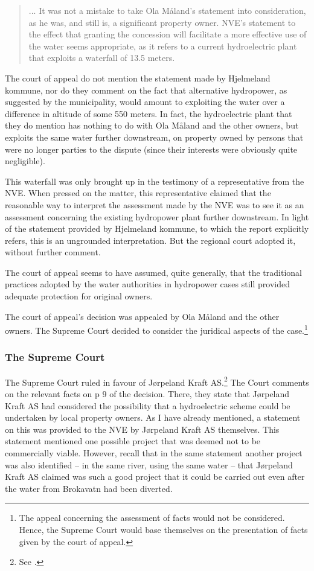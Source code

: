 \begin{quote}... It was not a mistake to take Ola Måland's statement into consideration, as he was, and still is, a significant property owner. NVE's statement to the effect that granting the concession will facilitate a more effective use of the water seems appropriate, as it refers to a current hydroelectric plant that exploits a waterfall of 13.5 meters.
\end{quote}

The court of appeal do not mention the statement made by Hjelmeland kommune, nor do they comment on the fact that alternative hydropower, as suggested by the municipality, would amount to exploiting the water over a difference in altitude of some 550 meters. In fact, the hydroelectric plant that they do mention has nothing to do with Ola Måland and the other owners, but exploits the same water further downstream, on property owned by persons that were no longer parties to the dispute (since their interests were obviously quite negligible).

This waterfall was only brought up in the testimony of a representative from the NVE. When pressed on the matter, this representative claimed that the reasonable way to interpret the assessment made by the NVE was to see it as an assessment concerning the existing hydropower plant further downstream. In light of the statement provided by Hjelmeland kommune, to which the report explicitly refers, this is an ungrounded interpretation. But the regional court adopted it, without further comment.

The court of appeal seems to have assumed, quite generally, that the traditional practices adopted by the water authorities in hydropower cases still provided adequate protection for original owners.

The court of appeal's decision was appealed by Ola Måland and the other owners. The Supreme Court decided to consider the juridical aspects of the case.\footnote{The appeal concerning the assessment of facts would not be considered. Hence, the Supreme Court would base themselves on the presentation of facts given by the court of appeal.}

\subsubsection{The Supreme Court}

The Supreme Court ruled in favour of Jørpeland Kraft AS.\footnote{See \cite{jorpeland11}.} The Court comments on the relevant facts on p 9 of the decision. There, they state that Jørpeland Kraft AS had considered the possibility that a hydroelectric scheme could be undertaken by local property owners. As I have already mentioned, a statement on this was provided to the NVE by Jørpeland Kraft AS themselves. This statement mentioned one possible project that was deemed not to be commercially viable. However, recall that in the same statement another project was also identified -- in the same river, using the same water -- that Jørpeland Kraft AS claimed was such a good project that it could be carried out even after the water from Brokavatn had been diverted.

